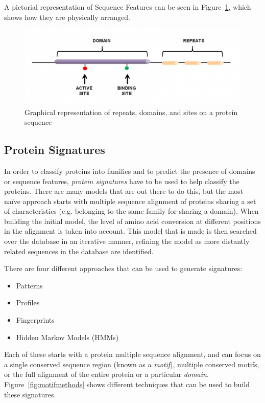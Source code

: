 \documentclass{article}
\begin{document}
A pictorial representation of Sequence Features can be seen in Figure~\ref{fig:seq-features}, which shows how they are physically arranged. 

\begin{figure}[h!]
\centering
\includegraphics[width=.75\textwidth]{sequencefeatures.png}
\caption{Graphical representation of repeats, domains, and sites on a protein sequence}
\label{fig:seq-features}
\end{figure}

\subsection*{Protein Signatures}

In order to classify proteins into families and to predict the presence of domains or sequence features, {\em protein signatures} have to be used to help classify the proteins. There are many models that are out there to do this, but the most na\"{i}ve approach starts with multiple sequence alignment of proteins sharing a set of characteristics (e.g. belonging to the same family for sharing a domain). When building the initial model, the level of amino acid conversion at different positions in the alignment is taken into account. This model that is made is then searched over the database in an iterative manner, refining the model as more distantly related sequences in the database are identified. 

There are four different approaches that can be used to generate signatures:

\begin{itemize}
\item Patterns
\item Profiles
\item Fingerprints
\item Hidden Markov Models (HMMs)
\end{itemize}

Each of these starts with a protein multiple sequence alignment, and can focus on a single conserved sequence region (known as a {\em motif}), multiple conserved motifs, or the full alignment of the entire protein or a particular {\em domain}. Figure~\ref{fig:motifmethods} shows different techniques that can be used to build these signatures.
\end{document}
